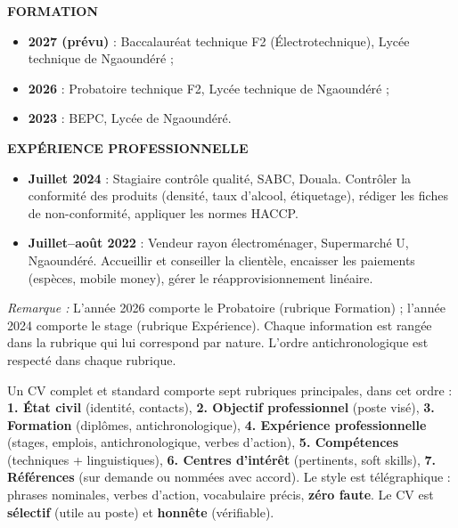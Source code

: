 \documentclass[11pt]{article}
\begin{document}
\begin{corrige}
\textbf{FORMATION}\par
\begin{itemize}
\item \textbf{2027 (prévu)} : Baccalauréat technique F2 (Électrotechnique), Lycée technique de Ngaoundéré ;
\item \textbf{2026} : Probatoire technique F2, Lycée technique de Ngaoundéré ;
\item \textbf{2023} : BEPC, Lycée de Ngaoundéré.
\end{itemize}

\textbf{EXPÉRIENCE PROFESSIONNELLE}\par
\begin{itemize}
\item \textbf{Juillet 2024} : Stagiaire contrôle qualité, SABC, Douala. Contrôler la conformité des produits (densité, taux d'alcool, étiquetage), rédiger les fiches de non-conformité, appliquer les normes HACCP.
\item \textbf{Juillet--août 2022} : Vendeur rayon électroménager, Supermarché U, Ngaoundéré. Accueillir et conseiller la clientèle, encaisser les paiements (espèces, mobile money), gérer le réapprovisionnement linéaire.
\end{itemize}

\emph{Remarque :} L'année 2026 comporte le Probatoire (rubrique Formation) ; l'année 2024 comporte le stage (rubrique Expérience). Chaque information est rangée dans la rubrique qui lui correspond par nature. L'ordre antichronologique est respecté dans chaque rubrique.
\end{corrige}

\begin{aretenir}
Un CV complet et standard comporte sept rubriques principales, dans cet ordre : \textbf{1. État civil} (identité, contacts), \textbf{2. Objectif professionnel} (poste visé), \textbf{3. Formation} (diplômes, antichronologique), \textbf{4. Expérience professionnelle} (stages, emplois, antichronologique, verbes d'action), \textbf{5. Compétences} (techniques + linguistiques), \textbf{6. Centres d'intérêt} (pertinents, soft skills), \textbf{7. Références} (sur demande ou nommées avec accord). Le style est télégraphique : phrases nominales, verbes d'action, vocabulaire précis, \textbf{zéro faute}. Le CV est \textbf{sélectif} (utile au poste) et \textbf{honnête} (vérifiable).
\end{aretenir}
\end{document}
